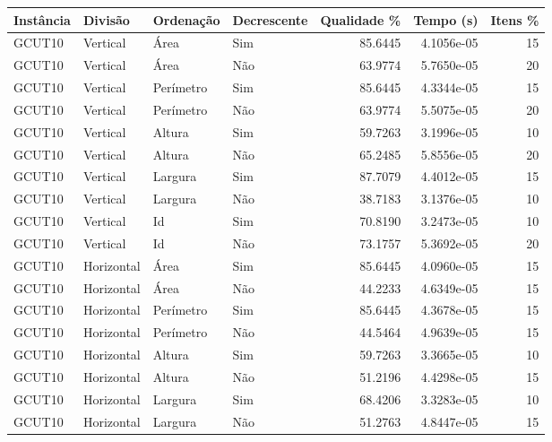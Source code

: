 \begin{tabular}{llllrrr}
    \hline
    Instância & Divisão     & Ordenação & Decrescente & Qualidade \% & Tempo (s)  & Itens \% \\
    \hline
    GCUT10    & Vertical    & Área      & Sim         & 85.6445      & 4.1056e-05 & 15       \\
    GCUT10    & Vertical    & Área      & Não         & 63.9774      & 5.7650e-05 & 20       \\
    GCUT10    & Vertical    & Perímetro & Sim         & 85.6445      & 4.3344e-05 & 15       \\
    GCUT10    & Vertical    & Perímetro & Não         & 63.9774      & 5.5075e-05 & 20       \\
    GCUT10    & Vertical    & Altura    & Sim         & 59.7263      & 3.1996e-05 & 10       \\
    GCUT10    & Vertical    & Altura    & Não         & 65.2485      & 5.8556e-05 & 20       \\
    GCUT10    & Vertical    & Largura   & Sim         & 87.7079      & 4.4012e-05 & 15       \\
    GCUT10    & Vertical    & Largura   & Não         & 38.7183      & 3.1376e-05 & 10       \\
    GCUT10    & Vertical    & Id        & Sim         & 70.8190      & 3.2473e-05 & 10       \\
    GCUT10    & Vertical    & Id        & Não         & 73.1757      & 5.3692e-05 & 20       \\
    GCUT10    & Horizontal  & Área      & Sim         & 85.6445      & 4.0960e-05 & 15       \\
    GCUT10    & Horizontal  & Área      & Não         & 44.2233      & 4.6349e-05 & 15       \\
    GCUT10    & Horizontal  & Perímetro & Sim         & 85.6445      & 4.3678e-05 & 15       \\
    GCUT10    & Horizontal  & Perímetro & Não         & 44.5464      & 4.9639e-05 & 15       \\
    GCUT10    & Horizontal  & Altura    & Sim         & 59.7263      & 3.3665e-05 & 10       \\
    GCUT10    & Horizontal  & Altura    & Não         & 51.2196      & 4.4298e-05 & 15       \\
    GCUT10    & Horizontal  & Largura   & Sim         & 68.4206      & 3.3283e-05 & 10       \\
    GCUT10    & Horizontal  & Largura   & Não         & 51.2763      & 4.8447e-05 & 15       \\

\end{tabular}

